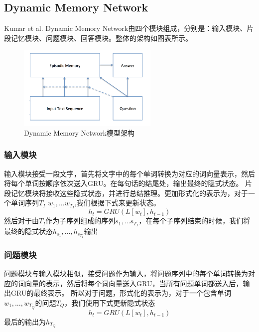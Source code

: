 \subsection{Dynamic Memory Network}
Kumar et al.\cite{DBLP:journals/corr/KumarISBEPOGS15} Dynamic Memory Network由四个模块组成，分别是：输入模块、片段记忆模块、问题模块、回答模块。整体的架构如图表所示。\\
\begin{figure}[h]
      \centering
        \includegraphics[width=0.6\textwidth]{./images/dynamic-memory-network-structure}
          \caption{Dynamic Memory Network模型架构}
      \end{figure} 
\subsubsection{输入模块}
输入模块接受一段文字，首先将文字中的每个单词转换为对应的词向量表示，然后将每个单词按顺序依次送入GRU。在每句话的结尾处，输出最终的隐式状态。
片段记忆模块将接收这些隐式状态，并进行总结推理。更加形式化的表示为，对于一个单词序列$T_I$ $w_1,...w_{T_I}$,我们根据下式来更新状态。\\
\begin{equation}
h_t = GRU(L[w_t],h_{t-1})
\end{equation}
然后对于由$T_I$作为子序列组成的序列$s_1,...s_{T_I}$，在每个子序列结束的时候，我们将最终的隐式状态$h_{s_1},...,h_{s_{T_I}}$输出
\subsubsection{问题模块}
问题模块与输入模块相似，接受问题作为输入，将问题序列中的每个单词转换为对应的词向量的表示，然后将每个词向量送入GRU，当所有问题单词都送入后，输出GRU的最终表示。
所以对于问题，形式化的表示为，对于一个包含单词$w_1,...,w_{T_Q}$的问题$T_Q$，我们使用下式更新隐式状态\\
\begin{equation}
h_t = GRU(L[w_t],h_{t-1})
\end{equation}
最后的输出为$h_{T_Q}$
